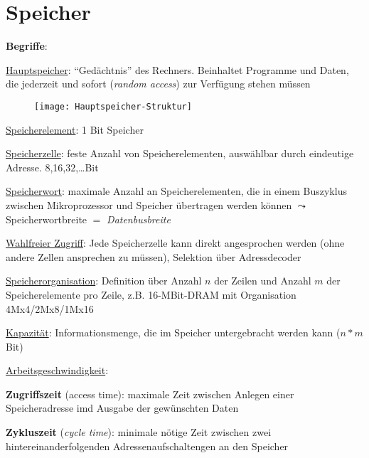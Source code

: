 \section{Speicher}
\label{sec:speicher}

\textbf{Begriffe}:
\begin{items}
	\item \underline{Hauptspeicher}: "`Gedächtnis"' des Rechners. Beinhaltet Programme und Daten, die jederzeit und sofort (\emph{random access}) zur Verfügung stehen müssen
	\begin{figure}[H]\centering\label{Hauptspeicher-Struktur}\texttt{[image: Hauptspeicher-Struktur]}\end{figure}

	\item \underline{Speicherelement}: 1 Bit Speicher

	\item \underline{Speicherzelle}: feste Anzahl von Speicherelementen, auswählbar durch eindeutige Adresse. 8,16,32,\dots Bit

	\item \underline{Speicherwort}: maximale Anzahl an Speicherelementen, die in einem Buszyklus zwischen Mikroprozessor und Speicher übertragen werden können \( \leadsto \) Speicherwortbreite \( = \) \emph{Datenbusbreite}

	\item \underline{Wahlfreier Zugriff}: Jede Speicherzelle kann direkt angesprochen werden (ohne andere Zellen ansprechen zu müssen), Selektion über Adressdecoder

	\item \underline{Speicherorganisation}: Definition über Anzahl \( n \) der Zeilen und Anzahl \( m \) der Speicherelemente pro Zeile, z.B. 16-MBit-DRAM mit Organisation 4Mx4/2Mx8/1Mx16

	\item \underline{Kapazität}: Informationsmenge, die im Speicher untergebracht werden kann (\( n*m \) Bit)

	\item \underline{Arbeitsgeschwindigkeit}:
	\begin{enumeration}
		\item \textbf{Zugriffszeit} (\emph{}access time): maximale Zeit zwischen Anlegen einer Speicheradresse imd Ausgabe der gewünschten Daten

		\item \textbf{Zykluszeit} (\emph{cycle time}): minimale nötige Zeit zwischen zwei hintereinanderfolgenden Adressenaufschaltengen an den Speicher
	\end{enumeration}
\end{items}